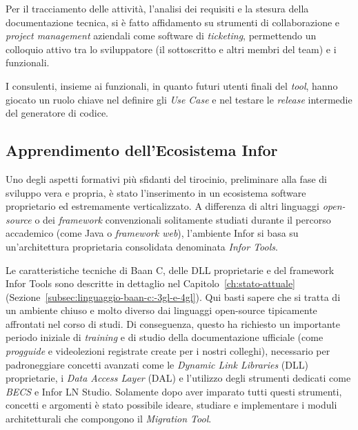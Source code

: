Per il tracciamento delle attività, l'analisi dei requisiti e la stesura della documentazione tecnica, si è fatto affidamento 
su strumenti di collaborazione e \textit{project management} aziendali come software di \textit{ticketing}, permettendo
un colloquio attivo tra lo sviluppatore (il sottoscritto e altri membri del team) e i funzionali.

I consulenti, insieme ai funzionali, in quanto futuri utenti finali del \textit{tool}, hanno giocato un ruolo chiave nel
definire gli \textit{Use Case} e nel testare le \textit{release} intermedie del generatore di codice.


\subsection{Apprendimento dell'Ecosistema Infor}\label{subsec:contesto-tecnologico-e-curva-di-apprendimento}
Uno degli aspetti formativi più sfidanti del tirocinio, preliminare alla fase di sviluppo vera e propria, è stato l'inserimento
in un ecosistema software proprietario ed estremamente verticalizzato.
A differenza di altri linguaggi \textit{open-source} o dei
\textit{framework} convenzionali solitamente studiati durante il percorso accademico (come Java o \textit{framework web}),
l'ambiente Infor si basa su un'architettura proprietaria consolidata denominata \textit{Infor Tools}.

Le caratteristiche tecniche di Baan C, delle DLL proprietarie e del framework Infor Tools sono descritte in dettaglio nel Capitolo~\ref{ch:stato-attuale} (Sezione~\ref{subsec:linguaggio-baan-c:-3gl-e-4gl}).
Qui basti sapere che si tratta di un ambiente chiuso e molto diverso dai linguaggi open-source tipicamente affrontati nel corso di studi.
Di conseguenza, questo ha richiesto un importante periodo iniziale di \textit{training} e di studio della documentazione ufficiale
(come \textit{progguide} e videolezioni registrate create per i nostri colleghi), necessario per
padroneggiare concetti avanzati come le \textit{Dynamic Link Libraries} (DLL) proprietarie, i \textit{Data Access Layer} 
(DAL) e l'utilizzo degli strumenti dedicati come \textit{BECS} e Infor LN Studio.
Solamente dopo aver imparato tutti questi strumenti, concetti e argomenti è stato possibile ideare, studiare e implementare i moduli architetturali che
compongono il \textit{Migration Tool}.

